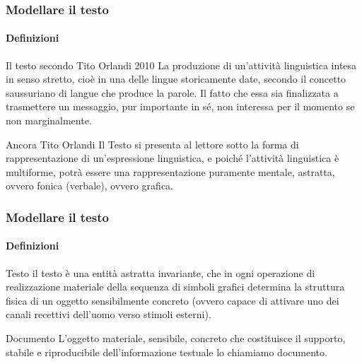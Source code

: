 \begin{frame}
	\frametitle{Modellare il testo}
	\framesubtitle{Definizioni}
	\addtocounter{nframe}{1}

	\begin{block}{Il testo secondo Tito Orlandi 2010}
		La produzione di un'attività linguistica intesa in senso stretto, cioè in una delle lingue storicamente date, secondo il concetto saussuriano di langue che produce la parole. Il fatto che essa sia finalizzata a trasmettere un messaggio, pur importante in sé, non interessa per il momento se non marginalmente.
	\end{block}

	\begin{block}{Ancora Tito Orlandi}
		Il Testo si presenta al lettore sotto la forma di rappresentazione di un'espressione linguistica, e poiché l'attività linguistica è multiforme, potrà essere una rappresentazione puramente mentale, astratta, ovvero fonica (verbale), ovvero grafica.
	\end{block}


\end{frame}

\begin{frame}
	\frametitle{Modellare il testo}
	\framesubtitle{Definizioni}
	\addtocounter{nframe}{1}

	\begin{block}{Testo}
		il testo è una entità astratta invariante, che in ogni operazione di realizzazione materiale della sequenza di simboli grafici determina la struttura fisica di un oggetto sensibilmente concreto (ovvero capace di attivare uno dei canali recettivi dell’uomo verso stimoli esterni).
	\end{block}

	\begin{block}{Documento}
		L'oggetto materiale, sensibile, concreto che costituisce il supporto, stabile e riproducibile dell’informazione testuale lo chiamiamo documento.
	\end{block}


\end{frame}











